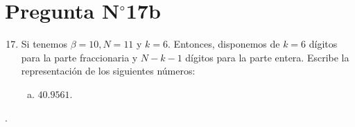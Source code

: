 \section{Pregunta N$^{\circ}$17b\qquad }

\begin{frame}
	\begin{enumerate}\setcounter{enumi}{16}
		\item

		      Si tenemos $\beta=10, N=11$ y $k=6$.
		      Entonces, disponemos de $k=6$ dígitos para la parte
		      fraccionaria y $N-k-1$ dígitos para la parte entera.
		      Escribe la representación de los siguientes números:

		      \begin{enumerate}[b)]
			      \item

			            $40.9561$.
		      \end{enumerate}
	\end{enumerate}

	\begin{solution}
		.
	\end{solution}
\end{frame}